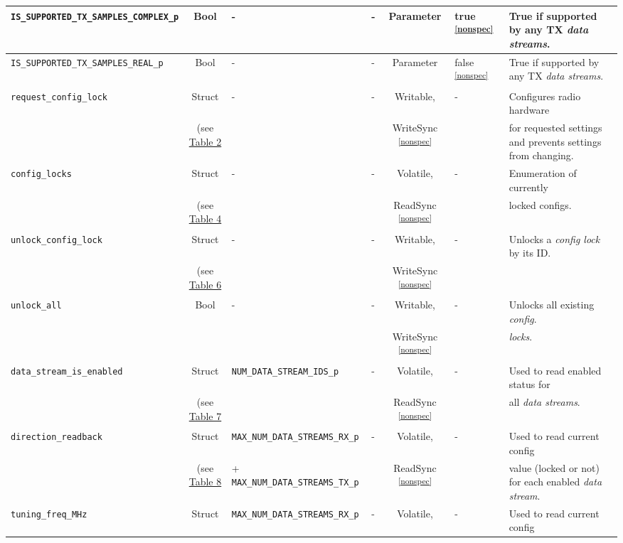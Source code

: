 \documentclass{article}
\begin{document}
\begin{landscape}
\begin{scriptsize}
\begin{longtable}{|p{5.16cm}|c|p{3.5cm}|p{3.4cm}|c|p{2.1cm}|p{3.75cm}|}
			\hline
			\verb+IS_SUPPORTED_TX_SAMPLES_COMPLEX_p+           & Bool   & -        & - & Parameter           & true \textsuperscript{\ref{nonspec}} & True if supported by any TX \textit{data streams}. \\
			\hline
			\verb+IS_SUPPORTED_TX_SAMPLES_REAL_p+              & Bool   & -        & - & Parameter           & false \textsuperscript{\ref{nonspec}} & True if supported by any TX \textit{data streams}. \\
			\hline
			\verb+request_config_lock+          & Struct & - & -       & Writable, & -       & Configures radio hardware \\
			 & (see \hyperlink{tab2}{Table 2} & & & WriteSync \textsuperscript{\ref{nonspec}} & & for requested settings and prevents settings from changing. \\
			\hline
			\verb+config_locks+                 & Struct & - & -       & Volatile, & -       & Enumeration of currently \\
			 & (see \hyperlink{tab4}{Table 4} & & & ReadSync \textsuperscript{\ref{nonspec}} & & locked configs. \\
			\hline
			\verb+unlock_config_lock+           & Struct & - & -       & Writable, & -       & Unlocks a \textit{config lock} by its ID. \\
			 & (see \hyperlink{tab6}{Table 6} & & & WriteSync \textsuperscript{\ref{nonspec}} & & \\
			\hline
			\verb+unlock_all+                   & Bool & - & -       & Writable, & -       & Unlocks all existing \textit{config}. \\
			 &                                & & & WriteSync \textsuperscript{\ref{nonspec}} & & \textit{locks}. \\
			\hline
			\verb+data_stream_is_enabled+       & Struct & \verb+NUM_DATA_STREAM_IDS_p+ & - & Volatile,    & -       & Used to read enabled status for \\
			 & (see \hyperlink{tab7}{Table 7} & & &  ReadSync \textsuperscript{\ref{nonspec}} & & all \textit{data streams}. \\
			\hline
			\verb+direction_readback+              & Struct & \verb+MAX_NUM_DATA_STREAMS_RX_p+ & - &Volatile, & -       & Used to read current config \\
			 & (see \hyperlink{tab8}{Table 8} & + \verb+MAX_NUM_DATA_STREAMS_TX_p+ & &  ReadSync \textsuperscript{\ref{nonspec}} & & value (locked or not) for each enabled \textit{data stream}. \\
			\hline
			\verb+tuning_freq_MHz+                 & Struct & \verb+MAX_NUM_DATA_STREAMS_RX_p+ & - &Volatile, & -       & Used to read current config \\

\end{longtable}
\end{scriptsize}
\end{landscape}
\end{document}
